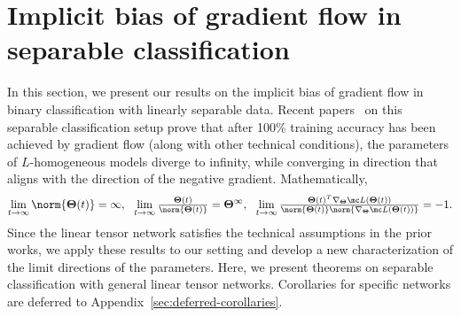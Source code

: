 \documentclass{article} %
\def\vv{{\bm{v}}}
\newcommand{\bTheta}{\bm{\Theta}}
\begin{document}
\section{Implicit bias of gradient flow in separable classification}
\label{sec:clsf}
In this section, we present our results on the implicit bias of gradient flow in binary classification with linearly separable data. Recent papers~\citep{lyu2020gradient, ji2020directional} on this separable classification setup prove that after 100\% training accuracy has been achieved by gradient flow (along with other technical conditions), the parameters of $L$-homogeneous models diverge to infinity, while converging in direction that aligns with the direction of the negative gradient.
Mathematically,
\begin{align*}
    \lim_{t\to\infty} \norm{\bTheta(t)} = \infty,
    ~~
    \lim_{t\to\infty}\tfrac{\bTheta(t)}{\norm{\bTheta(t)}} = \bTheta^\infty,
    ~~
    \lim_{t\to\infty} \tfrac{\bTheta(t)^T \nabla_{\bTheta} \mc L(\bTheta(t))}{\norm{\bTheta(t)} \norm{\nabla_{\bTheta} \mc L(\bTheta(t))}}
    = -1.
\end{align*}
Since the linear tensor network satisfies the technical assumptions in the prior works, we apply these results to our setting and develop a new characterization of the limit directions of the parameters.
Here, we present theorems on separable classification with general linear tensor networks. Corollaries for specific networks are deferred to Appendix~\ref{sec:deferred-corollaries}. 


\end{document}
